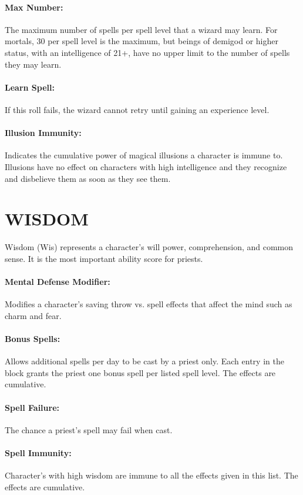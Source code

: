 \begin{multicols}{2}
\paragraph{Max Number:} The maximum number of spells per spell level that a wizard may learn.  For mortals, 30 per spell level is the maximum, but beings of demigod or higher status, with an intelligence of 21+, have no upper limit to the number of spells they may learn.

\paragraph{Learn Spell:}  If this roll fails, the wizard cannot retry until gaining an experience level.

\paragraph{Illusion Immunity:}  Indicates the cumulative power of magical illusions a character is immune to.  Illusions have no effect on characters with high intelligence and they recognize and disbelieve them as soon as they see them.
 
\section{WISDOM}

Wisdom (Wis) represents a character's will power, comprehension, and common sense.  It is the most important ability score for priests.

\paragraph{Mental Defense Modifier:}  Modifies a character's saving throw vs. spell effects that affect the mind such as charm and fear.  

\paragraph{Bonus Spells:}  Allows additional spells per day to be cast by a priest only.  Each entry in the block grants the priest one bonus spell per listed spell level.  The effects are cumulative.

\paragraph{Spell Failure:}  The chance a priest's spell may fail when cast.

\paragraph{Spell Immunity:}  Character's with high wisdom are immune to all the effects given in this list.  The effects are cumulative.

\end{multicols}

